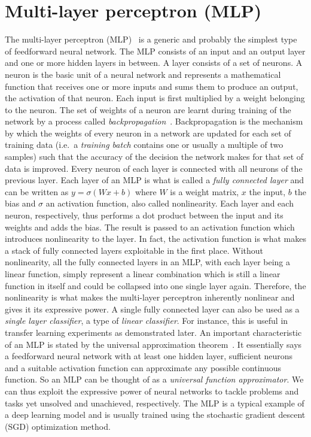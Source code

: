 \documentclass[a4paper,12pt]{report}
\begin{document}
\section{Multi-layer perceptron (MLP)}\label{subsec:mlp}
The multi-layer perceptron (MLP)~\cite{Perceptron,DLReview} is a generic and probably the simplest type of feedforward neural network. The MLP consists of an input and an output layer and one or more hidden layers in between. A layer consists of a set of neurons. A neuron is the basic unit of a neural network and represents a mathematical function that receives one or more inputs and sums them to produce an output, the activation of that neuron. Each input is first multiplied by a weight belonging to the neuron. The set of weights of a neuron are learnt during training of the network by a process called \textit{backpropagation}~\cite{Backprop,DLReview}. Backpropagation is the mechanism by which the weights of every neuron in a network are updated for each set of training data (i.e.\ a \textit{training batch} contains one or usually a multiple of two samples) such that the accuracy of the decision the network makes for that set of data is improved. Every neuron of each layer is connected with all neurons of the previous layer. Each layer of an MLP is what is called a \textit{fully connected layer} and can be written as $y = \sigma (Wx + b)$ where $W$ is a weight matrix, $x$ the input, $b$ the bias and $\sigma$ an activation function, also called nonlinearity. Each layer and each neuron, respectively, thus performs a dot product between the input and its weights and adds the bias. The result is passed to an activation function which introduces nonlinearity to the layer. In fact, the activation function is what makes a stack of fully connected layers exploitable in the first place. Without nonlinearity, all the fully connected layers in an MLP, with each layer being a linear function, simply represent a linear combination which is still a linear function in itself and could be collapsed into one single layer again. Therefore, the nonlinearity is what makes the multi-layer perceptron inherently nonlinear and gives it its expressive power. A single fully connected layer can also be used as a \textit{single layer classifier}, a type of \textit{linear classifier}. For instance, this is useful in transfer learning experiments as demonstrated later. An important characteristic of an MLP is stated by the universal approximation theorem~\cite{mlpUnivApprox}. It essentially says a feedforward neural network with at least one hidden layer, sufficient neurons and a suitable activation function can approximate any possible continuous function. So an MLP can be thought of as a \textit{universal function approximator}. We can thus exploit the expressive power of neural networks to tackle problems and tasks yet unsolved and unachieved, respectively. The MLP is a typical example of a deep learning model and is usually trained using the stochastic gradient descent (SGD) optimization method.
\end{document}
